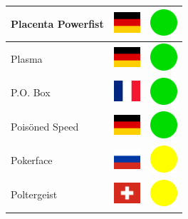 \documentclass[12pt, a4paper, twoside]{report}
\begin{document}
\begin{center}
\begin{longtable}{|p{5cm}|p{2cm}|p{2cm}|}
Placenta Powerfist & \includegraphics[width=1cm]{4x3/de} & \includegraphics[width=1cm]{likes/y} \\ \hline
Plasma & \includegraphics[width=1cm]{4x3/de} & \includegraphics[width=1cm]{likes/y} \\ \hline
P.O. Box & \includegraphics[width=1cm]{4x3/fr} & \includegraphics[width=1cm]{likes/y} \\ \hline
Poisöned Speed & \includegraphics[width=1cm]{4x3/de} & \includegraphics[width=1cm]{likes/y} \\ \hline
Pokerface & \includegraphics[width=1cm]{4x3/ru} & \includegraphics[width=1cm]{likes/m} \\ \hline
Poltergeist & \includegraphics[width=1cm]{4x3/ch} & \includegraphics[width=1cm]{likes/m} \\ \hline

\end{longtable}
\end{center}
\end{document}
